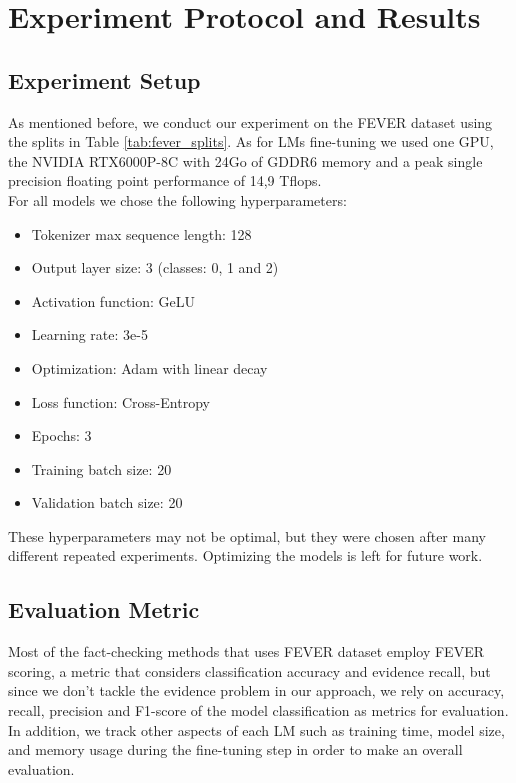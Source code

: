 \documentclass[conference]{IEEEtran}
\begin{document}
\section{Experiment Protocol and Results}
\subsection{Experiment Setup}
As mentioned before, we conduct our experiment on the FEVER dataset using the splits in Table \ref{tab:fever_splits}. As for LMs fine-tuning we used one GPU, the NVIDIA RTX6000P-8C with 24Go of GDDR6 memory and a peak single precision floating point performance of 14,9 Tflops.\\

For all models we chose the following hyperparameters:

\begin{itemize}
\item Tokenizer max sequence length: 128
\item Output layer size: 3 (classes: 0, 1 and 2)
\item Activation function: GeLU
\item Learning rate: 3e-5
\item Optimization: Adam with linear decay
\item Loss function: Cross-Entropy
\item Epochs: 3
\item Training batch size: 20
\item Validation batch size: 20\\
\end{itemize}

These hyperparameters may not be optimal, but they were chosen after many different repeated experiments. Optimizing the models is left for future work.
\subsection{Evaluation Metric}
Most of the fact-checking methods that uses FEVER dataset employ FEVER scoring\cite{thorne2018fever}, a metric that considers classification accuracy and evidence recall, but since we don't tackle the evidence problem in our approach, we rely on accuracy, recall, precision and F1-score of the model classification as metrics for evaluation.\\
In addition, we track other aspects of each LM such as training time, model size, and memory usage during the fine-tuning step in order to make an overall evaluation.
\end{document}
